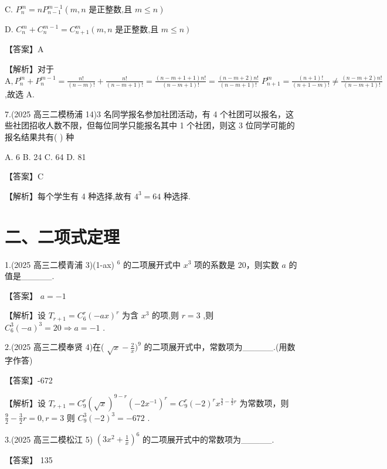 \documentclass[10pt]{article}
\begin{document}
C. \({P}_{n}^{m} = n{P}_{n - 1}^{m - 1}\left( {m,n\text{ 是正整数,且 }m \leq  n}\right)\)

D. \({C}_{n}^{m} + {C}_{n}^{m - 1} = {C}_{n + 1}^{m}\left( {m,n}\right.\) 是正整数,且 \(\left. {m \leq  n}\right)\)

【答案】A

【解析】对于 \(\mathrm{A},{P}_{n}^{m} + {P}_{n}^{m - 1} = \frac{n!}{\left( {n - m}\right) !} + \frac{n!}{\left( {n - m + 1}\right) !} = \frac{\left( {n - m + 1 + 1}\right) n!}{\left( {n - m + 1}\right) !} = \frac{\left( {n - m + 2}\right) n!}{\left( {n - m + 1}\right) !} \; {P}_{n + 1}^{m} = \frac{\left( {n + 1}\right) !}{\left( {n + 1 - m}\right) !} \neq  \frac{\left( {n - m + 2}\right) n!}{\left( {n - m + 1}\right) !}\) ,故选 A.

7.(2025 高三二模杨浦 14)3 名同学报名参加社团活动，有 4 个社团可以报名，这些社团招收人数不限，但每位同学只能报名其中 1 个社团，则这 3 位同学可能的报名结果共有( ) 种

A. 6 B. 24 C. 64 D. 81

【答案】C

【解析】每个学生有 4 种选择,故有 \({4}^{3} = {64}\) 种选择.

\section*{二、二项式定理}

1.(2025 高三二模青浦 3)(1-ax) \({}^{6}\) 的二项展开式中 \({x}^{3}\) 项的系数是 20，则实数 \(a\) 的值是\_\_\_\_\_.

【答案】 \(a =  - 1\)

【解析】设 \({T}_{r + 1} = {C}_{6}^{r}{\left( -ax\right) }^{r}\) 为含 \({x}^{3}\) 的项,则 \(r = 3\) ,则 \({C}_{6}^{3}{\left( -a\right) }^{3} = {20} \Rightarrow  a =  - 1\) .

2.(2025 高三二模奉贤 4)在( \(\sqrt{x} - \frac{2}{x}{)}^{9}\) 的二项展开式中，常数项为\_\_\_\_\_.(用数字作答)

【答案】-672

【解析】设 \({T}_{r + 1} = {C}_{9}^{r}{\left( \sqrt{x}\right) }^{9 - r}{\left( -2{x}^{-1}\right) }^{r} = {C}_{9}^{r}{\left( -2\right) }^{r}{x}^{\frac{9}{2} - \frac{3}{2}r}\) 为常数项，则 \(\frac{9}{2} - \frac{3}{2}r = 0,r = 3\) 则 \({C}_{9}^{3}{\left( -2\right) }^{3} =  - {672}\) .

3.(2025 高三二模松江 5) \({\left( 3{x}^{2} + \frac{1}{x}\right) }^{6}\) 的二项展开式中的常数项为\_\_\_\_\_.

【答案】 135
\end{document}
